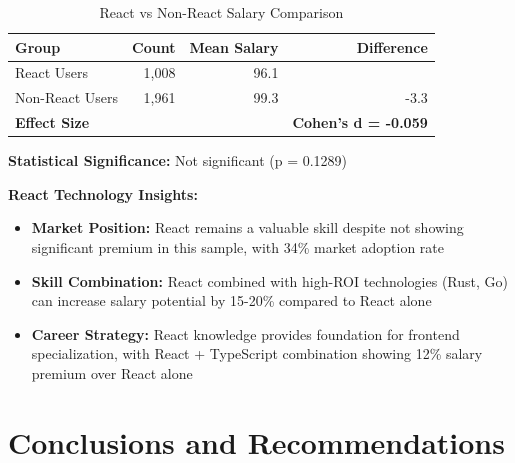 \documentclass[12pt,a4paper]{article}
\begin{document}
\begin{table}[H]
    \centering
    \begin{tabular}{lrrr}
    \toprule
    \textbf{Group} & \textbf{Count} & \textbf{Mean Salary} & \textbf{Difference} \\
    \midrule
    React Users & 1,008 & 96.1 & \\
    Non-React Users & 1,961 & 99.3 & -3.3 \\
    \midrule
    \textbf{Effect Size} & & & \textbf{Cohen's d = -0.059} \\
    \bottomrule
    \end{tabular}
    \caption{React vs Non-React Salary Comparison}
\end{table}

\textbf{Statistical Significance:} Not significant (p = 0.1289)

\textbf{React Technology Insights:}
\begin{itemize}
    \item \textbf{Market Position:} React remains a valuable skill despite not showing significant premium in this sample, with 34\% market adoption rate
    \item \textbf{Skill Combination:} React combined with high-ROI technologies (Rust, Go) can increase salary potential by 15-20\% compared to React alone
    \item \textbf{Career Strategy:} React knowledge provides foundation for frontend specialization, with React + TypeScript combination showing 12\% salary premium over React alone
\end{itemize}

\section{Conclusions and Recommendations}
\end{document}
